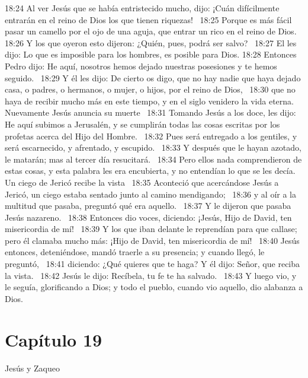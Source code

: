 18:24 Al ver Jesús que se había entristecido mucho, dijo: ¡Cuán difícilmente entrarán en el reino de Dios los que tienen riquezas!  
18:25 Porque es más fácil pasar un camello por el ojo de una aguja, que entrar un rico en el reino de Dios.  
18:26 Y los que oyeron esto dijeron: ¿Quién, pues, podrá ser salvo?  
18:27 El les dijo: Lo que es imposible para los hombres, es posible para Dios. 
18:28 Entonces Pedro dijo: He aquí, nosotros hemos dejado nuestras posesiones y te hemos seguido.  
18:29 Y él les dijo: De cierto os digo, que no hay nadie que haya dejado casa, o padres, o hermanos, o mujer, o hijos, por el reino de Dios,  
18:30 que no haya de recibir mucho más en este tiempo, y en el siglo venidero la vida eterna.  
Nuevamente Jesús anuncia su muerte   
18:31 Tomando Jesús a los doce, les dijo: He aquí subimos a Jerusalén, y se cumplirán todas las cosas escritas por los profetas acerca del Hijo del Hombre.  
18:32 Pues será entregado a los gentiles, y será escarnecido, y afrentado, y escupido.  
18:33 Y después que le hayan azotado, le matarán; mas al tercer día resucitará.  
18:34 Pero ellos nada comprendieron de estas cosas, y esta palabra les era encubierta, y no entendían lo que se les decía.  
Un ciego de Jericó recibe la vista   
18:35 Aconteció que acercándose Jesús a Jericó, un ciego estaba sentado junto al camino mendigando;  
18:36 y al oír a la multitud que pasaba, preguntó qué era aquello.  
18:37 Y le dijeron que pasaba Jesús nazareno.  
18:38 Entonces dio voces, diciendo: ¡Jesús, Hijo de David, ten misericordia de mí!  
18:39 Y los que iban delante le reprendían para que callase; pero él clamaba mucho más: ¡Hijo de David, ten misericordia de mí!  
18:40 Jesús entonces, deteniéndose, mandó traerle a su presencia; y cuando llegó, le preguntó,  
18:41 diciendo: ¿Qué quieres que te haga? Y él dijo: Señor, que reciba la vista.  
18:42 Jesús le dijo: Recíbela, tu fe te ha salvado.  
18:43 Y luego vio, y le seguía, glorificando a Dios; y todo el pueblo, cuando vio aquello, dio alabanza a Dios.  
\section*{Capítulo 19 }
Jesús y Zaqueo  

